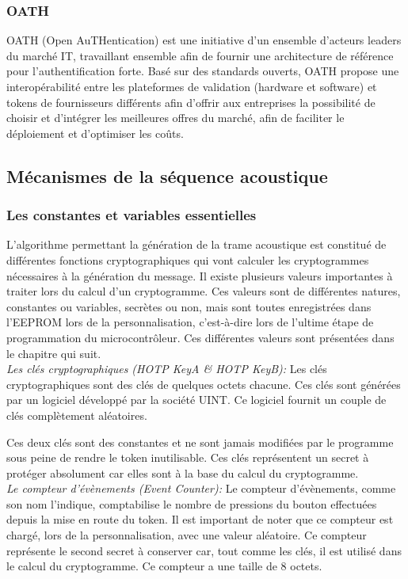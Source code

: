 \subsubsection{OATH}
OATH (Open AuTHentication) est une initiative d'un ensemble d'acteurs leaders du marché IT, travaillant ensemble afin de fournir une architecture de référence pour l'authentification forte. Basé sur des standards ouverts, OATH propose une interopérabilité entre les plateformes de validation (hardware et software) et tokens de fournisseurs différents afin d’offrir aux entreprises la possibilité de choisir et d’intégrer les meilleures offres du marché, afin de faciliter le déploiement et d'optimiser les coûts.

\subsection{Mécanismes de la séquence acoustique}
\subsubsection{Les constantes et variables essentielles}

L’algorithme permettant la génération de la trame acoustique est constitué de différentes fonctions cryptographiques qui vont calculer les cryptogrammes nécessaires à la génération du message. Il existe plusieurs valeurs importantes à traiter lors du calcul d’un cryptogramme. Ces valeurs sont de différentes natures, constantes ou variables, secrètes ou non, mais sont toutes enregistrées dans l’EEPROM lors de la personnalisation, c'est-à-dire lors de l’ultime étape de programmation du microcontrôleur. Ces différentes valeurs sont présentées dans le chapitre qui suit.\\

\textsl{Les clés cryptographiques (HOTP KeyA \& HOTP KeyB):}
Les clés cryptographiques sont des clés de quelques octets chacune. Ces clés sont générées par un logiciel développé par la société UINT. Ce logiciel fournit un couple de clés complètement aléatoires.

Ces deux clés sont des constantes et ne sont jamais modifiées par le programme sous peine de rendre le token inutilisable. Ces clés représentent un secret à protéger absolument car elles sont à la base du calcul du cryptogramme.\\

\textsl{Le compteur d’évènements (Event Counter):}
Le compteur d’évènements, comme son nom l’indique, comptabilise le nombre de pressions du bouton effectuées depuis la mise en route du token. Il est important de noter que ce compteur est chargé, lors de la personnalisation, avec une valeur aléatoire. Ce compteur représente le second secret à conserver car, tout comme les clés, il est utilisé dans le calcul du cryptogramme. Ce compteur a une taille de 8 octets.\\

